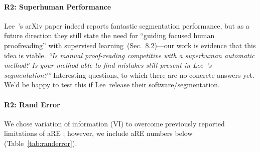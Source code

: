 \documentclass[10pt,twocolumn,letterpaper]{article}
\begin{document}
\paragraph{R2: Superhuman Performance} Lee~\etal's arXiv paper indeed reports fantastic segmentation performance, but as a future direction they still state the need for ``guiding focused human proofreading'' with supervised learning~(Sec.~8.2)---our work is evidence that this idea is viable. \newline \noindent \emph{``Is manual proof-reading competitive with a superhuman automatic method? Is your method able to find mistakes still present in Lee~\etal's segmentation?''} Interesting questions, to which there are no concrete answers yet. We'd be happy to test this if Lee~\etal release their software/segmentation. 



\paragraph{R2: Rand Error} We chose variation of information (VI) to overcome previously reported limitations of aRE \cite[p.~5]{NunezIglesias2013Machine}; however, we include aRE numbers below (Table~\ref{tab:randerror}).

\begin{table}[h]
\caption{Forced Choice User Experiment in adapted Rand Error (aRE) metric (lower is better). Novices and experts using GP perform better than using FP.}
\label{tab:randerror}
\end{table}
\end{document}
